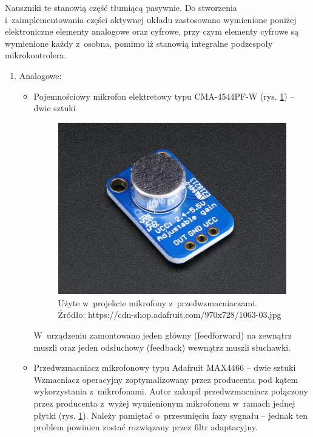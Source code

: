 Nauszniki te stanowią część tłumiącą pasywnie. Do stworzenia i~zaimplementowania części aktywnej układu zastosowano wymienione poniżej elektroniczne elementy analogowe oraz cyfrowe, przy czym elementy cyfrowe są wymienione każdy z~osobna, pomimo iż stanowią integralne podzespoły mikrokontrolera.
\begin{enumerate}
	\item Analogowe:
	\begin{itemize}
		\item Pojemnościowy mikrofon elektretowy typu CMA-4544PF-W (rys. \ref{fig:mikrofony_max4466}) -- dwie sztuki\\
		\begin{figure}[h!]
			\centering
			\includegraphics[scale=0.2]{../Assets/adafruit_max4466.png}
			\caption{Użyte w~projekcie mikrofony z~przedwzmacniaczami.\\ Źródło: https://cdn-shop.adafruit.com/970x728/1063-03.jpg}
			\label{fig:mikrofony_max4466}
		\end{figure}
		W~urządzeniu zamontowano jeden główny (feedforward) na zewnątrz muszli oraz jeden odsłuchowy (feedback) wewnątrz muszli słuchawki.
		\item Przedwzmacniacz mikrofonowy typu Adafruit MAX4466 -- dwie sztuki\\
		Wzmacniacz operacyjny zoptymalizowany przez producenta pod kątem wykorzystania z~mikrofonami. Autor zakupił przedwzmacniacz połączony przez producenta z~wyżej wymienionym mikrofonem w~ramach jednej płytki (rys. \ref{fig:mikrofony_max4466}). Należy pamiętać o~przesunięciu fazy sygnału -- jednak ten problem powinien zostać rozwiązany przez filtr adaptacyjny.

\end{itemize}
\end{enumerate}
